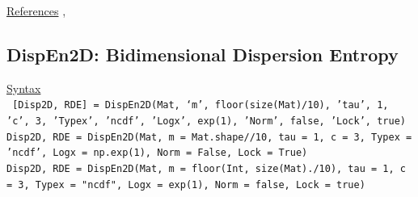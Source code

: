 \documentclass[12pt, a4paper, titlepage, openany]{book}
\begin{document}
\noindent \ul{References}\hspace{1cm}
\cite{Dist2D1},



\newpage
\subsection{\normalsize DispEn2D: \hspace{15mm} Bidimensional Dispersion Entropy}
\noindent\ul{Syntax} \vspace{6mm} \\ \noindent \texttt{\footnotesize
[Disp2D, RDE] = DispEn2D(Mat, ‘m’, floor(size(Mat)/10), 'tau', 1, 'c', 3, 'Typex', 'ncdf', 'Logx', exp(1), 'Norm', false, 'Lock', true)\\
Disp2D, RDE  = DispEn2D(Mat, m = Mat.shape//10, tau = 1, c = 3, Typex = 'ncdf', Logx = np.exp(1), Norm = False, Lock = True)\\
Disp2D, RDE  = DispEn2D(Mat, m = floor(Int, size(Mat)./10), tau = 1, c = 3, Typex = "ncdf", Logx = exp(1), Norm = false, Lock = true)}
\end{document}
